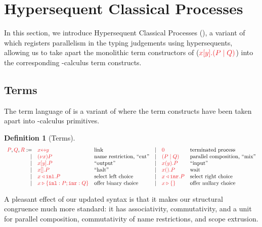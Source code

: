 \documentclass[submission,copyright,creativecommons]{eptcs}
\newtheorem{definition}[lemma]{Definition}
\begin{document}
\section{Hypersequent Classical Processes}
\label{sec:hcp}

In this section, we introduce Hypersequent Classical Processes (\hcp), a variant of \cp which registers parallelism in the typing judgements using hypersequents, allowing us to take apart the monolithic term constructors of \cp (\eg $\tm{\cpSend{x}{y}{P}{Q}}$) into the corresponding \textpi-calculus term constructs.

\subsection{Terms}
The term language of \hcp is a variant of \cp where the term constructs have been taken apart into \textpi-calculus primitives.
\begin{definition}[Terms]\label{def:hcp-terms}
  \[
    \begin{array}{rllrll}
      \tm{P}, \tm{Q}, \tm{R}
           :=& \tm{\cpLink{x}{y}}         &\text{link}
      &  \mid& \tm{\piHalt}               &\text{terminated process}
      \\ \mid& \tm{\piNew{x}{P}}          &\text{name restriction, ``cut''}
      &  \mid& \tm{( \piPar{P}{Q} )}      &\text{parallel composition, ``mix''}
      \\ \mid& \tm{\piBoundSend{x}{y}{P}} &\text{``output''}
      &  \mid& \tm{\piRecv{x}{y}{P}}      &\text{``input''}
      \\ \mid& \tm{\piBoundSend{x}{}{P}}  &\text{``halt''}
      &  \mid& \tm{\cpWait{x}{}{P}}       &\text{wait}
      \\ \mid& \tm{\cpInl{x}{P}}          &\text{select left choice}
      &  \mid& \tm{\cpInr{x}{P}}          &\text{select right choice}
      \\ \mid& \tm{\cpCase{x}{P}{Q}}      &\text{offer binary choice}
      &  \mid& \tm{\cpAbsurd{x}}          &\text{offer nullary choice}
    \end{array}
  \]
\end{definition}\noindent
A pleasant effect of our updated syntax is that it makes our structural congruence much more standard: it has associativity, commutativity, and a unit for parallel composition, commutativity of name restrictions, and scope extrusion.
\end{document}

